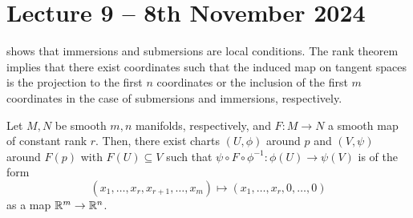 \section{Lecture 9 -- 8th November 2024}\label{sec: lecture 9}
 shows that immersions and submersions are local conditions. The rank theorem implies that there exist coordinates such that the induced map on tangent spaces is the projection to the first $n$ coordinates or the inclusion of the first $m$ coordinates in the case of submersions and immersions, respectively. 
\begin{theorem}[Rank]\label{thm: rank theorem}
    Let $M,N$ be smooth $m,n$ manifolds, respectively, and $F:M\to N$ a smooth map of constant rank $r$. Then, there exist charts $(U,\phi)$ around $p$ and $(V,\psi)$ around $F(p)$ with $F(U)\subseteq V$ such that $\psi\circ F\circ \phi^{-1}:\phi(U)\to\psi(V)$ is of the form 
    $$(x_{1},\dots,x_{r},x_{r+1},\dots,x_{m})\mapsto(x_{1},\dots,x_{r},0,\dots,0)$$
    as a map $\mathbb{R}^{m}\to\mathbb{R}^{n}$. 
\end{theorem}
